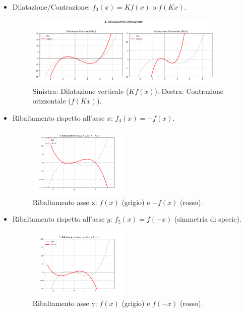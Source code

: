 \begin{itemize}
\item Dilatazione/Contrazione: $f_3(x) = K f(x)$ o $f(K x)$.
    \begin{figure}[H]
    \centering
    \includegraphics[width=0.9\textwidth]{img/dilatazione.png}
    \caption{Sinistra: Dilatazione verticale ($K f(x)$). Destra: Contrazione orizzontale ($f(K x)$).}
  \end{figure}

\item Ribaltamento rispetto all'asse $x$: $f_4(x) = -f(x)$.
    \begin{figure}[H]
    \centering
    \includegraphics[width=0.45\textwidth]{img/ribaltamento_x.png}
    \caption{Ribaltamento asse x: $f(x)$ (grigio) e $-f(x)$ (rosso).}
  \end{figure}

\item Ribaltamento rispetto all'asse $y$: $f_5(x) = f(-x)$ (simmetria di specie).
    \begin{figure}[H]
    \centering
    \includegraphics[width=0.45\textwidth]{img/ribaltamento_y.png}
    \caption{Ribaltamento asse y: $f(x)$ (grigio) e $f(-x)$ (rosso).}
  \end{figure}


\end{itemize}

